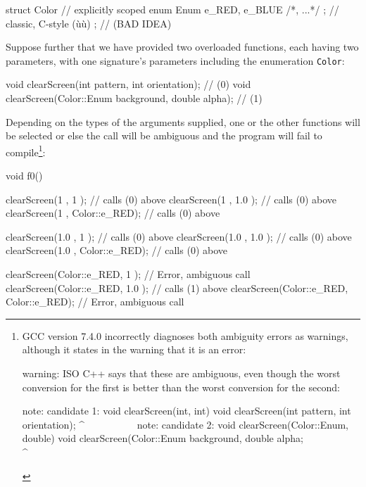 \begin{emcppslisting}
struct Color
{                                           // explicitly scoped
    enum Enum { e_RED, e_BLUE /*, ...*/ };  // classic, C-style (ù{}ù)
};                                          // (BAD IDEA)
\end{emcppslisting}

\noindent Suppose further that we have provided two overloaded functions, each
having two parameters, with one signature's parameters including the
enumeration \texttt{Color}:

\begin{emcppslisting}
void clearScreen(int pattern, int orientation);          // (0)
void clearScreen(Color::Enum background, double alpha);  // (1)
\end{emcppslisting}

\noindent Depending on the types of the arguments supplied, one or the other
functions will be selected or else the call will be ambiguous and the
program will fail to compile{\cprotect\footnote{GCC version 7.4.0
incorrectly diagnoses both ambiguity errors as warnings, although it
states in the warning that it is an error:

\begin{emcppslisting}[basicstyle={\ttfamily\footnotesize}]
warning: ISO C++ says that these are ambiguous, even though the worst conversion for the
         first is better than the worst conversion for the second:

note: candidate 1: void clearScreen(int, int)
void clearScreen(int pattern, int orientation);
     ^~~~~~~~~~~
note: candidate 2: void clearScreen(Color::Enum, double)
void clearScreen(Color::Enum background, double alpha;
     ^~~~~~~~~~~
\end{emcppslisting}
      }}:

\begin{emcppslisting}
void f0()
{
    clearScreen(1           , 1           );  // calls (0) above
    clearScreen(1           , 1.0         );  // calls (0) above
    clearScreen(1           , Color::e_RED);  // calls (0) above

    clearScreen(1.0         , 1           );  // calls (0) above
    clearScreen(1.0         , 1.0         );  // calls (0) above
    clearScreen(1.0         , Color::e_RED);  // calls (0) above

    clearScreen(Color::e_RED, 1           );  // Error, ambiguous call
    clearScreen(Color::e_RED, 1.0         );  // calls (1) above
    clearScreen(Color::e_RED, Color::e_RED);  // Error, ambiguous call
}
\end{emcppslisting}

